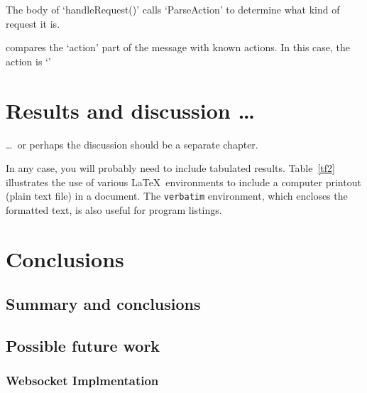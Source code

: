 \documentclass[12pt,openany,a4paper]{book}
\newcommand{\tab}[1]  {Table~\ref{#1}}		%
\begin{document}
The body of `handleRequest()' calls `ParseAction' to determine what kind of request it is.


compares the `action' part of the message with known actions. In this case, the action is `'


\chapter{Results and discussion \ldots}

\ldots\ or perhaps the discussion should be a separate chapter.

In any case, you will probably need to include tabulated results.
\tab{tf2} illustrates the use of various \LaTeX\ environments to
include a computer printout (plain text file) in a document.  The
\texttt{verbatim} environment, which encloses the formatted text, is
also useful for program listings.

\chapter{Conclusions}

\section{Summary and conclusions}

\section{Possible future work}
\subsection{Websocket Implmentation}


\appendix


\newpage
{}
\mbox{}
\newpage


\end{document}
